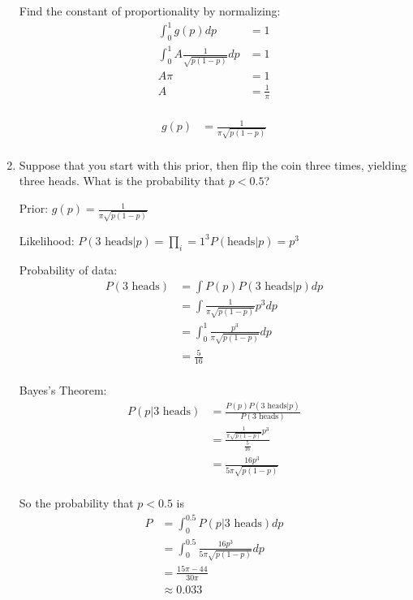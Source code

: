 \begin{enumerate}[label=\textbf{\Alph*}.]
    Find the constant of proportionality by normalizing:
    \begin{align*}
        \int_0^1 g(p)dp &= 1 \\
        \int_0^1 A \frac{1}{\sqrt{p(1-p)}} dp &= 1 \\
        A \pi &= 1 \\
        A &= \frac{1}{\pi} \\
    \end{align*}

    \begin{align*}
        g(p) &= \frac{1}{\pi\sqrt{p(1-p)}} \\
    \end{align*}

    \item Suppose that you start with this prior, then flip the coin three times, yielding three heads. What is the probability that $p<0.5$?
    
    Prior: $g(p) = \frac{1}{\pi\sqrt{p(1-p)}}$

    Likelihood: $P(\text{3 heads}|p) = \prod_i=1^3 P(\text{heads}|p) = p^3$

    Probability of data:
    \begin{align*}
        P(\text{3 heads}) &= \int P(p) P(\text{3 heads}|p) dp \\
        &= \int \frac{1}{\pi\sqrt{p(1-p)}} p^3 dp \\
        &= \int_0^1 \frac{p^3}{\pi\sqrt{p(1-p)}} dp \\
        &= \frac{5}{16} \\
    \end{align*}

    Bayes's Theorem:
    \begin{align*}
        P(p|\text{3 heads}) &= \frac{P(p)P(\text{3 heads}|p)}{P(\text{3 heads})} \\
        &= \frac{\frac{1}{\pi\sqrt{p(1-p)}} p^3 }{\frac{5}{16}} \\
        &= \frac{16p^3}{5\pi\sqrt{p(1-p)}} \\
    \end{align*}

    So the probability that $p<0.5$ is
    \begin{align*}
        P &= \int_0^{0.5} P(p|\text{3 heads}) dp \\
        &= \int_0^{0.5} \frac{16p^3}{5\pi\sqrt{p(1-p)}} dp \\
        &= \frac{15\pi - 44}{30\pi} \\
        &\approx 0.033 \\
    \end{align*}

\end{enumerate}

